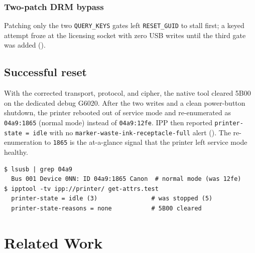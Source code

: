 \documentclass[conference]{IEEEtran}
\begin{document}
\subsubsection{Two-patch DRM bypass}
Patching only the two \texttt{QUERY\_KEYS} gates left \texttt{RESET\_GUID}
to stall first; a keyed attempt froze at the licensing socket with zero
USB writes until the third gate was added ().

\subsection{Successful reset}
\label{sec:results-success}

With the corrected transport, protocol, and cipher, the native tool
cleared 5B00 on the dedicated debug G6020. After the two writes and a
clean power-button shutdown, the printer rebooted out of service mode and
re-enumerated as \texttt{04a9:1865} (normal mode) instead of
\texttt{04a9:12fe}. IPP then reported \texttt{printer-state = idle} with no
\texttt{marker-waste-ink-receptacle-full} alert (). The
re-enumeration to \texttt{1865} is the at-a-glance signal that the printer
left service mode healthy.

\begin{lstlisting}[style=shell,caption={Post-reset: re-enumeration to
normal mode and a clear IPP state.},label={lst:success}]
$ lsusb | grep 04a9
  Bus 001 Device 0NN: ID 04a9:1865 Canon  # normal mode (was 12fe)
$ ipptool -tv ipp://printer/ get-attrs.test
  printer-state = idle (3)               # was stopped (5)
  printer-state-reasons = none           # 5B00 cleared
\end{lstlisting}

\section{Related Work}
\label{sec:related}
\end{document}
